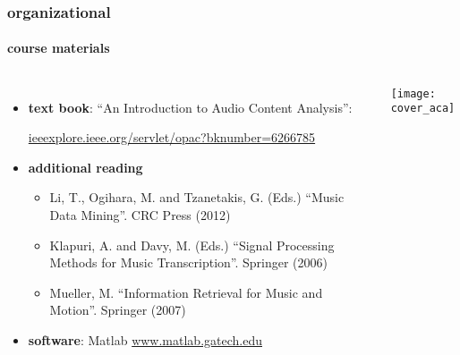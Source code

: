         \begin{frame}\frametitle{organizational}\framesubtitle{course materials}
            \begin{columns}[T]
                    \begin{itemize}
                        \item   \textbf{text book}: ``An Introduction to Audio Content Analysis'':
                        
                            \url{ieeexplore.ieee.org/servlet/opac?bknumber=6266785}

                        \smallskip
                        \item<2->  \textbf{additional reading}
                            \begin{itemize}
                                \item   Li, T., Ogihara, M. and Tzanetakis, G.  (Eds.) ``Music Data Mining''. CRC Press (2012)
                                \item   Klapuri, A. and Davy, M. (Eds.) ``Signal Processing Methods for Music Transcription''. Springer (2006)
                                \item   Mueller, M. ``Information Retrieval for Music and Motion''. Springer (2007)
                            \end{itemize}

                        \smallskip
                        \item<3->   \textbf{software}: Matlab
                            \url{www.matlab.gatech.edu}
                    \end{itemize}
                    \texttt{[image: cover\_aca]}
                    \vspace{40mm}
             \end{columns}
       \end{frame}

